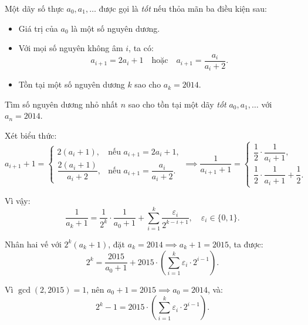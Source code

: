 \ifshowproblemandsoln
\ifshowproblem\begin{problem}\label{problem:APMO-2015-P3}\fi
\ifshowsoln\begin{problem}\fi
    Một dãy số thực \( a_0, a_1, \ldots \) được gọi là \textit{tốt} nếu thỏa mãn ba điều kiện sau:
    \begin{itemize}[topsep=0pt, partopsep=0pt, itemsep=0pt]
        \item Giá trị của \( a_0 \) là một số nguyên dương.
        \item Với mọi số nguyên không âm \( i \), ta có:
        \[
            a_{i+1} = 2a_i + 1 \quad \text{hoặc} \quad a_{i+1} = \frac{a_i}{a_i + 2}.
        \]
        \item Tồn tại một số nguyên dương \( k \) sao cho \( a_k = 2014 \).
    \end{itemize}

    Tìm số nguyên dương nhỏ nhất \( n \) sao cho tồn tại một dãy \textit{tốt} \( a_0, a_1, \ldots \) với \( a_n = 2014 \).
\end{problem}
\fi

\ifshowsoln
\begin{soln}\footnotemark
    Xét biểu thức:
    \[
        a_{i+1} + 1 = 
        \begin{cases}
            2(a_i + 1), &\text{nếu } a_{i+1} = 2a_i + 1, \\
            \dfrac{2(a_i + 1)}{a_i + 2}, &\text{nếu } a_{i+1} = \dfrac{a_i}{a_i + 2}.
        \end{cases}
    \implies \dfrac{1}{a_{i+1} + 1} = 
        \begin{cases}
            \dfrac{1}{2} \cdot \dfrac{1}{a_i + 1}, \\
            \dfrac{1}{2} \cdot \dfrac{1}{a_i + 1} + \dfrac{1}{2}.
        \end{cases}
    \]

    Vì vậy:
    \[
        \dfrac{1}{a_k + 1} = \dfrac{1}{2^k} \cdot \dfrac{1}{a_0 + 1} + \sum_{i=1}^k \dfrac{\varepsilon_i}{2^{k - i + 1}}, \quad \varepsilon_i \in \{0, 1\}.
    \]

    Nhân hai vế với \( 2^k(a_k + 1) \), đặt \( a_k = 2014 \implies a_k + 1 = 2015 \), ta được:
    \[
        2^k = \dfrac{2015}{a_0 + 1} + 2015 \cdot \left( \sum_{i=1}^k \varepsilon_i \cdot 2^{i - 1} \right).
    \]

    Vì \( \gcd(2, 2015) = 1 \), nên \( a_0 + 1 = 2015 \implies a_0 = 2014 \), và:
    \[
        2^k - 1 = 2015 \cdot \left( \sum_{i=1}^k \varepsilon_i \cdot 2^{i - 1} \right).
    \]


\end{soln}
\end{problem}
